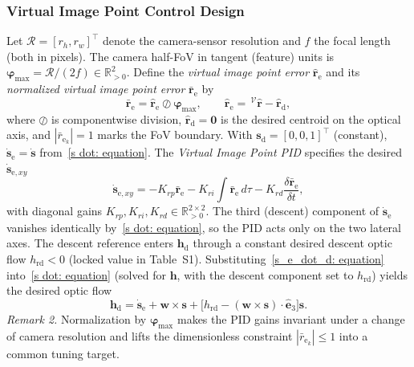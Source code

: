 \subsubsection{Virtual Image Point Control Design} \label{virtual image point control: section}
Let $\mathcal{R}=[r_h,r_w]^\top$ denote the camera-sensor resolution and $f$ the focal length (both in pixels). The camera half-FoV in tangent (feature) units is $\boldsymbol{\varphi}_\text{max}=\mathcal{R}/(2f)\in\mathbb{R}^2_{>0}$. Define the \emph{virtual image point error} $\hat{\boldsymbol{r}}_\text{e}$ and its \emph{normalized virtual image point error} $\bar{\boldsymbol{r}}_\text{e}$ by
\begin{equation} \label{normalized error: equation}
    \bar{\boldsymbol{r}}_\text{e} = \hat{\boldsymbol{r}}_\text{e}\oslash\boldsymbol{\varphi}_\text{max},\qquad\hat{\boldsymbol{r}}_\text{e}=\,^\mathcal{V}\hat{\boldsymbol{r}}-\hat{\boldsymbol{r}}_\text{d},
\end{equation}
where $\oslash$ is componentwise division, $\hat{\boldsymbol{r}}_\text{d}=\boldsymbol{0}$ is the desired centroid on the optical axis, and $|\bar{r}_{\text{e}_k}|=1$ marks the FoV boundary. With $\boldsymbol{s}_\text{d}=[0,0,1]^\top$ (constant), $\dot{\boldsymbol{s}}_\text{e}=\dot{\boldsymbol{s}}$ from~\eqref{s dot: equation}. The \emph{Virtual Image Point PID} specifies the desired $\dot{\boldsymbol{s}}_{\text{e},xy}$
\begin{equation} \label{s_e_dot_d: equation}
    \dot{\boldsymbol{s}}_{\text{e},xy} = -K_{rp}\bar{\boldsymbol{r}}_\text{e} - K_{ri}\!\int\bar{\boldsymbol{r}}_\text{e}\,d\tau - K_{rd}\frac{\delta\bar{\boldsymbol{r}}_\text{e}}{\delta t},
\end{equation}
with diagonal gains $K_{rp},K_{ri},K_{rd}\in\mathbb{R}^{2\times 2}_{>0}$. The third (descent) component of $\dot{\boldsymbol{s}}_\text{e}$ vanishes identically by~\eqref{s dot: equation}, so the PID acts only on the two lateral axes. The descent reference enters $\boldsymbol{h}_\text{d}$ through a constant desired descent optic flow $h_\text{rd}<0$ (locked value in Table~S1). Substituting~\eqref{s_e_dot_d: equation} into~\eqref{s dot: equation} (solved for $\boldsymbol{h}$, with the descent component set to $h_\text{rd}$) yields the desired optic flow
\begin{equation} \label{h_d final: equation}
    \boldsymbol{h}_\text{d} = \dot{\boldsymbol{s}}_\text{e} + \boldsymbol{w}\times\boldsymbol{s} + \big[h_\text{rd} - (\boldsymbol{w}\times\boldsymbol{s})\cdot\hat{\boldsymbol{e}}_3\big]\boldsymbol{s}.
\end{equation}
\textit{Remark 2.} Normalization by $\boldsymbol{\varphi}_\text{max}$ makes the PID gains invariant under a change of camera resolution and lifts the dimensionless constraint $|\bar{r}_{\text{e}_k}|\le 1$ into a common tuning target.

